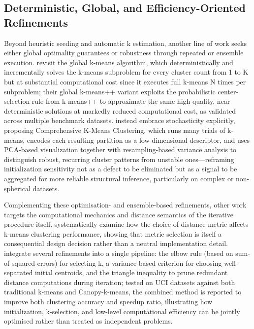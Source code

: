 \subsection{Deterministic, Global, and Efficiency-Oriented Refinements}
Beyond heuristic seeding and automatic k estimation, another line of work seeks either global optimality guarantees or robustness through repeated or ensemble execution. \cite{vardakas2022global} revisit the global k-means algorithm, which deterministically and incrementally solves the k-means subproblem for every cluster count from 1 to K but at substantial computational cost since it executes full k-means N times per subproblem; their global k-means++ variant exploits the probabilistic center-selection rule from k-means++ to approximate the same high-quality, near-deterministic solutions at markedly reduced computational cost, as validated across multiple benchmark datasets. \cite{xiao2024comprehensive} instead embrace stochasticity explicitly, proposing Comprehensive K-Means Clustering, which runs many trials of k-means, encodes each resulting partition as a low-dimensional descriptor, and uses PCA-based visualization together with resampling-based variance analysis to distinguish robust, recurring cluster patterns from unstable ones---reframing initialization sensitivity not as a defect to be eliminated but as a signal to be aggregated for more reliable structural inference, particularly on complex or non-spherical datasets.

Complementing these optimisation- and ensemble-based refinements, other work targets the computational mechanics and distance semantics of the iterative procedure itself. \cite{ghazal2021performances} systematically examine how the choice of distance metric affects k-means clustering performance, showing that metric selection is itself a consequential design decision rather than a neutral implementation detail. \cite{zhao2022design} integrate several refinements into a single pipeline: the elbow rule (based on sum-of-squared-errors) for selecting k, a variance-based criterion for choosing well-separated initial centroids, and the triangle inequality to prune redundant distance computations during iteration; tested on UCI datasets against both traditional k-means and Canopy-k-means, the combined method is reported to improve both clustering accuracy and speedup ratio, illustrating how initialization, k-selection, and low-level computational efficiency can be jointly optimised rather than treated as independent problems.


